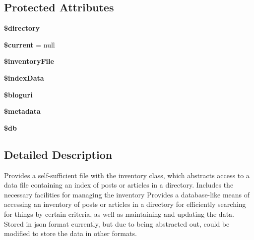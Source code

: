 \subsection*{Protected Attributes}
\begin{DoxyCompactItemize}
\item 
\hypertarget{classdirectoryIndex_a214bfe9090993b77c936ae2c39c2ece2}{{\bfseries \$directory}}\label{classdirectoryIndex_a214bfe9090993b77c936ae2c39c2ece2}

\item 
\hypertarget{classdirectoryIndex_a971891b34c58aac49405bd3ded632b45}{{\bfseries \$current} = null}\label{classdirectoryIndex_a971891b34c58aac49405bd3ded632b45}

\item 
\hypertarget{classdirectoryIndex_a1de2db2ede73fb1ac97d167848c4524e}{{\bfseries \$inventory\-File}}\label{classdirectoryIndex_a1de2db2ede73fb1ac97d167848c4524e}

\item 
\hypertarget{classdirectoryIndex_a742f284e261fc4cd9ed9d41cb8906d47}{{\bfseries \$index\-Data}}\label{classdirectoryIndex_a742f284e261fc4cd9ed9d41cb8906d47}

\item 
\hypertarget{classdirectoryIndex_a3472b1ecb7958fe955555414d6880102}{{\bfseries \$bloguri}}\label{classdirectoryIndex_a3472b1ecb7958fe955555414d6880102}

\item 
\hypertarget{classdirectoryIndex_a66db1b3b1fa8d8eeb8e9dde5296b4a48}{{\bfseries \$metadata}}\label{classdirectoryIndex_a66db1b3b1fa8d8eeb8e9dde5296b4a48}

\item 
\hypertarget{classdirectoryIndex_a6f9ce88cabb4fe567676e6fec27c71a1}{{\bfseries \$db}}\label{classdirectoryIndex_a6f9ce88cabb4fe567676e6fec27c71a1}

\end{DoxyCompactItemize}


\subsection{Detailed Description}
Provides a self-\/sufficient file with the inventory class, which abstracts access to a data file containing an index of posts or articles in a directory. Includes the necessary facilities for managing the inventory Provides a database-\/like means of accessing an inventory of posts or articles in a directory for efficiently searching for things by certain criteria, as well as maintaining and updating the data. Stored in json format currently, but due to being abstracted out, could be modified to store the data in other formats.

